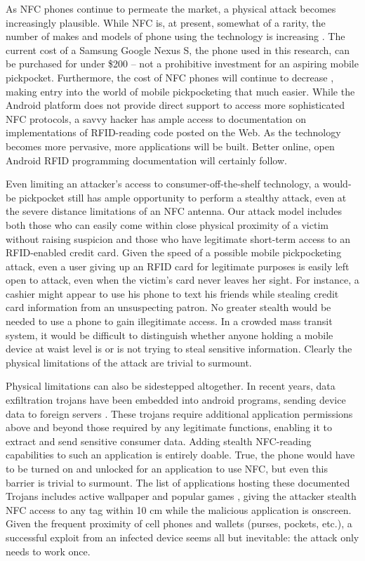 \documentclass{IEEEtran}
\begin{document}
As NFC phones continue to permeate the market, a physical attack becomes increasingly plausible.  While NFC is, at present, somewhat of a rarity, the number of makes and models of phone using the technology is increasing \cite{list-of-nfc-phones}.  The current cost of a Samsung Google Nexus S, the phone used in this research, can be purchased for under \$200 -- not a prohibitive investment for an aspiring mobile pickpocket.  Furthermore, the cost of NFC phones will continue to decrease \cite{ds-nfc-enabling-technology}, making entry into the world of mobile pickpocketing that much easier.  While the Android platform does not provide direct support to access more sophisticated NFC protocols, a savvy hacker has ample access to documentation on implementations of RFID-reading code posted on the Web.  As the technology becomes more pervasive, more applications will be built.  Better online, open Android RFID programming documentation will certainly follow.

Even limiting an attacker's access to consumer-off-the-shelf technology, a would-be pickpocket still has ample opportunity to perform a stealthy attack, even at the severe distance limitations of an NFC antenna.  Our attack model includes both those who can easily come within close physical proximity of a victim without raising suspicion and those who have legitimate short-term access to an RFID-enabled credit card.  Given the speed of a possible mobile pickpocketing attack, even a user giving up an RFID card for legitimate purposes is easily left open to attack, even when the victim's card never leaves her sight.  For instance, a cashier might appear to use his phone to text his friends while stealing credit card information from an unsuspecting patron.  No greater stealth would be needed to use a phone to gain illegitimate access.  In a crowded mass transit system, it would be difficult to distinguish whether anyone holding a mobile device at waist level is or is not trying to steal sensitive information.  Clearly the physical limitations of the attack are trivial to surmount.

Physical limitations can also be sidestepped altogether.  In recent years, data exfiltration trojans have been embedded into android programs, sending device data to foreign servers \cite{droiddreamlight}.  These trojans require additional application permissions above and beyond those required by any legitimate functions, enabling it to extract and send sensitive consumer data.  Adding stealth NFC-reading capabilities to such an application is entirely doable.  True, the phone would have to be turned on and unlocked for an application to use NFC, but even this barrier is trivial to surmount.  The list of applications hosting these documented Trojans includes active wallpaper and popular games \cite{venturebeat-malicious-wallpaper}, giving the attacker stealth NFC access to any tag within 10 cm while the malicious application is onscreen.  Given the frequent proximity of cell phones and wallets (purses, pockets, etc.), a successful exploit from an infected device seems all but inevitable: the attack only needs to work once.  
\end{document}
